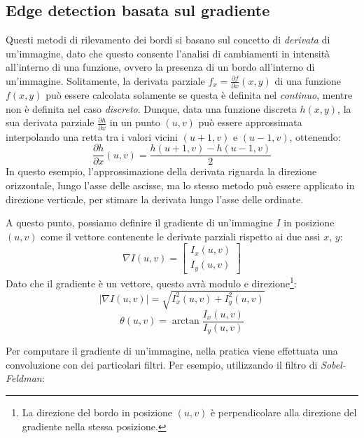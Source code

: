 \subsection{Edge detection basata sul gradiente}
Questi metodi di rilevamento dei bordi si basano sul concetto di \textit{derivata} di un'immagine, dato che questo consente l'analisi di cambiamenti in intensit\`a all'interno di una funzione, ovvero la presenza di un bordo all'interno di un'immagine. Solitamente, la derivata parziale $f_{x}=\frac{\partial f}{\partial x}(x, y)$ di una funzione $f(x, y)$ pu\`o essere calcolata solamente se questa \`e  definita nel \textit{continuo}, mentre non \`e definita nel caso \textit{discreto}. Dunque, data una funzione discreta $h(x, y)$, la sua derivata parziale $\frac{\partial h}{\partial x}$ in un punto $(u, v)$ pu\`o essere approssimata interpolando una retta tra i valori vicini $(u + 1, v)$ e $(u - 1, v)$, ottenendo:
\begin{equation}
	\frac{\partial h}{\partial x}(u, v) = \frac{h(u + 1, v) - h(u - 1, v)}{2}
	\label{eq:image-derivative}
\end{equation}
In questo esempio, l'approssimazione della derivata riguarda la direzione orizzontale, lungo l'asse delle ascisse, ma lo stesso metodo pu\`o essere applicato in direzione verticale, per stimare la derivata lungo l'asse delle ordinate.\par
A questo punto, possiamo definire il gradiente di un'immagine $I$ in posizione $(u, v)$ come il vettore contenente le derivate parziali rispetto ai due assi $x$, $y$:
\begin{equation}
	\nabla I(u, v) = 
		\begin{bmatrix}
			I_{x}(u, v) \\ I_{y}(u, v)
		\end{bmatrix}
	\label{eq:image-gradient}
\end{equation}
Dato che il gradiente \`e un vettore, questo avr\`a modulo e direzione\footnote{La direzione del bordo in posizione $(u, v)$ \`e perpendicolare alla direzione del gradiente nella stessa posizione.}:
\begin{equation}
	|\nabla I(u, v)| = \sqrt{I_{x}^{2}(u, v)+I_{y}^{2}(u, v)}
	\label{eq:image-gradient-magnitude}
\end{equation}
\begin{equation}
	\theta (u, v) = \arctan{\frac{I_{x}(u, v)}{I_{y}(u, v)}}
	\label{eq:image-gradient-direction}
\end{equation}\par
Per computare il gradiente di un'immagine, nella pratica viene effettuata una convoluzione con dei particolari filtri. Per esempio, utilizzando il filtro di \textit{Sobel-Feldman}:\\

